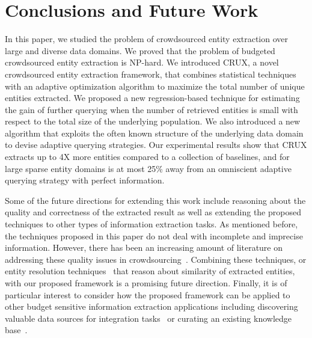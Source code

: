 
\section{Conclusions and Future Work}
\label{sec:conclusions}
In this paper, we studied the problem of crowdsourced entity extraction over large and diverse data domains. We proved that the problem of budgeted crowdsourced entity extraction is NP-hard. We introduced CRUX, a novel crowdsourced entity extraction framework, that combines statistical techniques with an adaptive optimization algorithm to maximize the total number of unique entities extracted. We proposed a new regression-based technique for estimating the gain of further querying when the number of retrieved entities is small with respect to the total size of the underlying population. We also introduced a new algorithm that exploits the often known structure of the underlying data domain to devise adaptive querying strategies. Our experimental results show that CRUX extracts up to 4X more entities compared to a collection of baselines, and for large sparse entity domains is at most 25\% away from an omniscient adaptive querying strategy with perfect information.

Some of the future directions for extending this work include reasoning about the quality and correctness of the extracted result as well as extending the proposed techniques to other types of information extraction tasks. As mentioned before, the techniques proposed in this paper do not deal with incomplete and imprecise information. However, there has been an increasing amount of literature on addressing these quality issues in crowdsourcing~\cite{ vox-populii, quality, nushi:14, raykar-whom-to-trust}. Combining these techniques, or entity resolution techniques~\cite{crowder} that reason about similarity of extracted entities, with our proposed framework is a promising future direction. Finally, it is of particular interest to consider how the proposed framework can be applied to other budget sensitive information extraction applications including discovering valuable data sources for integration tasks~\cite{rekatsinas:2015, rekatsinas:2014} or curating an existing knowledge base~\cite{kondredi:2014}.